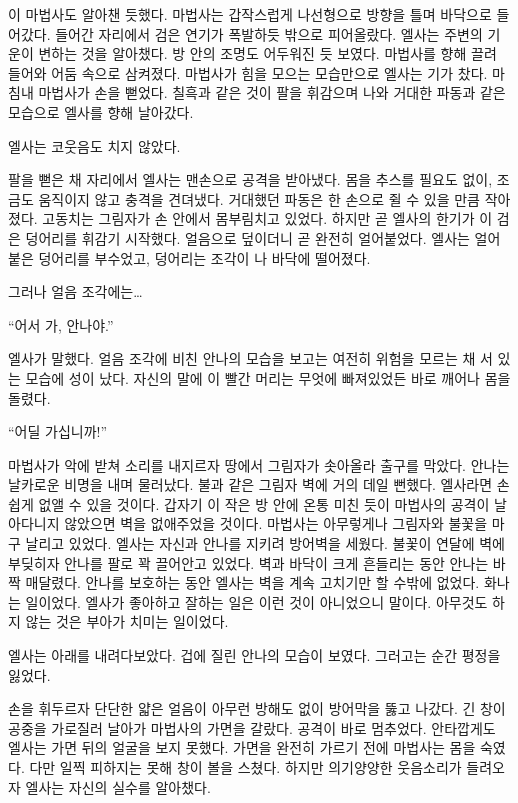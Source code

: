 이 마법사도 알아챈 듯했다. 마법사는 갑작스럽게 나선형으로 방향을 틀며 바닥으로 들어갔다. 들어간 자리에서 검은 연기가 폭발하듯 밖으로 피어올랐다. 엘사는 주변의 기운이 변하는 것을 알아챘다. 방 안의 조명도 어두워진 듯 보였다. 마법사를 향해 끌려 들어와 어둠 속으로 삼켜졌다. 마법사가 힘을 모으는 모습만으로 엘사는 기가 찼다. 마침내 마법사가 손을 뻗었다. 칠흑과 같은 것이 팔을 휘감으며 나와 거대한 파동과 같은 모습으로 엘사를 향해 날아갔다.

엘사는 코웃음도 치지 않았다.

팔을 뻗은 채 자리에서 엘사는 맨손으로 공격을 받아냈다. 몸을 추스를 필요도 없이, 조금도 움직이지 않고 충격을 견뎌냈다. 거대했던 파동은 한 손으로 쥘 수 있을 만큼 작아졌다. 고동치는 그림자가 손 안에서 몸부림치고 있었다. 하지만 곧 엘사의 한기가 이 검은 덩어리를 휘감기 시작했다. 얼음으로 덮이더니 곧 완전히 얼어붙었다. 엘사는 얼어붙은 덩어리를 부수었고, 덩어리는 조각이 나 바닥에 떨어졌다.

그러나 얼음 조각에는\ldots

``어서 가, 안나야.''

엘사가 말했다. 얼음 조각에 비친 안나의 모습을 보고는 여전히 위험을 모르는 채 서 있는 모습에 성이 났다. 자신의 말에 이 빨간 머리는 무엇에 빠져있었든 바로 깨어나 몸을 돌렸다.

``어딜 가십니까!''

마법사가 악에 받쳐 소리를 내지르자 땅에서 그림자가 솟아올라 출구를 막았다. 안나는 날카로운 비명을 내며 물러났다. 불과 같은 그림자 벽에 거의 데일 뻔했다. 엘사라면 손쉽게 없앨 수 있을 것이다. 갑자기 이 작은 방 안에 온통 미친 듯이 마법사의 공격이 날아다니지 않았으면 벽을 없애주었을 것이다. 마법사는 아무렇게나 그림자와 불꽃을 마구 날리고 있었다. 엘사는 자신과 안나를 지키려 방어벽을 세웠다. 불꽃이 연달에 벽에 부딪히자 안나를 팔로 꽉 끌어안고 있었다. 벽과 바닥이 크게 흔들리는 동안 안나는 바짝 매달렸다. 안나를 보호하는 동안 엘사는 벽을 계속 고치기만 할 수밖에 없었다. 화나는 일이었다. 엘사가 좋아하고 잘하는 일은 이런 것이 아니었으니 말이다. 아무것도 하지 않는 것은 부아가 치미는 일이었다.

엘사는 아래를 내려다보았다. 겁에 질린 안나의 모습이 보였다. 그러고는 순간 평정을 잃었다.

손을 휘두르자 단단한 얇은 얼음이 아무런 방해도 없이 방어막을 뚫고 나갔다. 긴 창이 공중을 가로질러 날아가 마법사의 가면을 갈랐다. 공격이 바로 멈추었다. 안타깝게도 엘사는 가면 뒤의 얼굴을 보지 못했다. 가면을 완전히 가르기 전에 마법사는 몸을 숙였다. 다만 일찍 피하지는 못해 창이 볼을 스쳤다. 하지만 의기양양한 웃음소리가 들려오자 엘사는 자신의 실수를 알아챘다.

